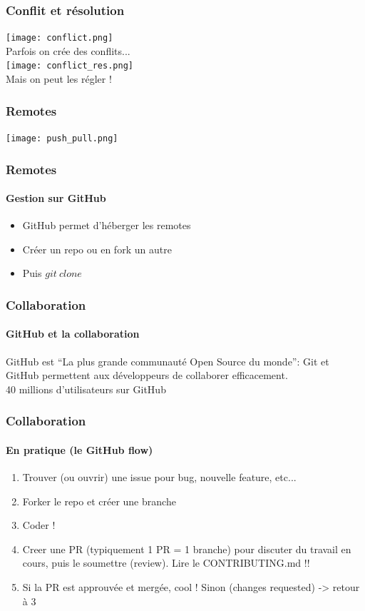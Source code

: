 \documentclass[aspectratio=169]{beamer}
\begin{document}
\begin{frame}
  \frametitle{Conflit et résolution}
  \begin{center}
    \texttt{[image: conflict.png]}\\
    Parfois on crée des conflits...\\\bigskip
    \texttt{[image: conflict\_res.png]}\\
    Mais on peut les régler !
  \end{center}
\end{frame}

\begin{frame}
  \frametitle{Remotes}
  \begin{center}
    \texttt{[image: push\_pull.png]}
  \end{center}
\end{frame}

\begin{frame}
  \frametitle{Remotes}
  \framesubtitle{Gestion sur GitHub}
  \begin{itemize}
  \item GitHub permet d'héberger les remotes
  \item Créer un repo ou en fork un autre
  \item Puis $git\:clone$
  \end{itemize}
\end{frame}

\begin{frame}
  \frametitle{Collaboration}
  \framesubtitle{GitHub et la collaboration}
  \centering
  GitHub est ``La plus grande communauté Open Source du monde'': Git et GitHub permettent aux développeurs de collaborer efficacement.\\
  \vspace{10pt}
  40 millions d'utilisateurs sur GitHub
\end{frame}

\begin{frame}
  \frametitle{Collaboration}
  \framesubtitle{En pratique (le GitHub flow)}
  \begin{enumerate}
  \item Trouver (ou ouvrir) une issue pour bug, nouvelle feature, etc...
  \item Forker le repo et créer une branche
  \item Coder !
  \item Creer une PR (typiquement 1 PR = 1 branche) pour discuter du travail en cours, puis le soumettre (review). Lire le CONTRIBUTING.md !!
  \item Si la PR est approuvée et mergée, cool ! Sinon (changes requested) -> retour à 3
  \end{enumerate}
\end{frame}
\end{document}
